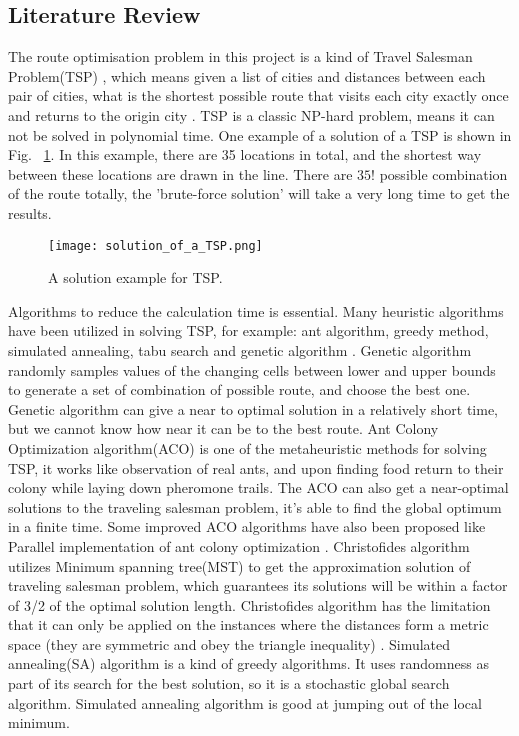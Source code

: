 \documentclass[final-report]{report-template}
\begin{document}
\subsection {Literature Review}
The route optimisation problem in this project is a kind of Travel Salesman Problem(TSP) \cite{lawler1985travelling}, 
which means given a list of cities and distances between each pair of cities, what is the shortest possible
route that visits each city exactly once and returns to the origin city \cite{TSP_wiki}. 
TSP is a classic NP-hard problem, means it can not be solved in polynomial time.
One example of a solution of a TSP is shown in Fig.~ \ref{fig:solution_of_TSP}.
In this example, there are 35 locations in total, and the shortest way between these locations are drawn in the line.
There are $35!$ possible combination of the route totally, the 'brute-force solution' will take a very long time to get the results.
\begin{figure}[H]
    \begin{center}
        \texttt{[image: solution\_of\_a\_TSP.png]}
    \end{center}
    \caption{\label{fig:solution_of_TSP} A solution example for TSP.}
\end{figure}

Algorithms to reduce the calculation time is essential. Many heuristic algorithms have been utilized in solving TSP\cite{TSP_review},
for example: ant algorithm, greedy method, simulated annealing, tabu search and genetic algorithm \cite{genetic_on_TSP}. 
Genetic algorithm randomly samples values of the changing cells between lower and upper bounds to generate
a set of combination of possible route, and choose the best one.
Genetic algorithm can give a near to optimal solution in a relatively short time, but we cannot know how near it can be to the best route.
Ant Colony Optimization algorithm(ACO) is one of the metaheuristic methods for solving TSP, 
it works like observation of real ants, and upon finding food return to their colony while laying down pheromone trails\cite{ACO_on_TSP}. 
The ACO can also get a near-optimal solutions to the traveling salesman problem, it's able to find the global optimum in a finite time.
Some improved ACO algorithms have also been proposed like Parallel implementation of ant colony optimization \cite{para_ACO}. 
Christofides algorithm\cite{VANBEVERN2020118} utilizes Minimum spanning tree(MST) to get the approximation solution of traveling salesman problem, 
which guarantees its solutions will be within a factor of 3/2 of the optimal solution length.
Christofides algorithm has the limitation that it can only be applied on the instances where the distances form a metric space (they are symmetric and obey the triangle inequality) \cite{christofides_inbook}.
Simulated annealing(SA) algorithm is a kind of greedy algorithms. It uses randomness as part of its search for the best solution, so it is a stochastic global search algorithm.
Simulated annealing algorithm is good at jumping out of the local minimum\cite{improved_SA}.\\
\end{document}

